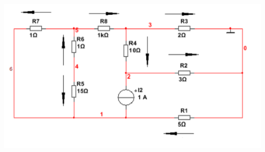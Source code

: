 \documentclass[12pt, a4paper]{report}
\begin{document}
    \begin{center}
        \includegraphics[scale = 1.2]{photo6.png}
    \end{center}

    \newpage
\end{document}

